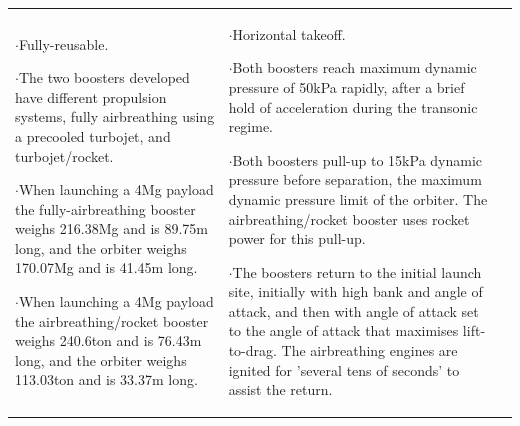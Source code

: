 {\begin{landscape}
\begin{xltabular}{\linewidth}{|X|X|X|}
	$\cdot$Fully-reusable. 
	
	$\cdot$The two boosters developed have different propulsion systems, fully airbreathing using a precooled turbojet, and turbojet/rocket.

	 $\cdot$When launching a 4Mg payload the fully-airbreathing booster weighs 216.38Mg and is 89.75m long, and the orbiter weighs 170.07Mg and is 41.45m long.
	 
	 $\cdot$When launching a 4Mg payload the airbreathing/rocket booster weighs 240.6ton and is 76.43m long, and the orbiter weighs 113.03ton and is 33.37m long.
	
	&\small
	
	$\cdot$Horizontal takeoff. 
	
	$\cdot$Both boosters reach maximum dynamic pressure of 50kPa rapidly, after a brief hold of acceleration during the transonic regime. 
	
	$\cdot$Both boosters pull-up to 15kPa dynamic pressure before separation, the maximum dynamic pressure limit of the orbiter. The airbreathing/rocket booster uses rocket power for this pull-up. 
	
	$\cdot$The boosters return to the initial launch site, initially with high bank and angle of attack, and then with angle of attack set to the angle of attack that maximises lift-to-drag. The airbreathing engines are ignited for 'several tens of seconds' to assist the return. 
	

\end{xltabular}
\end{landscape}}
